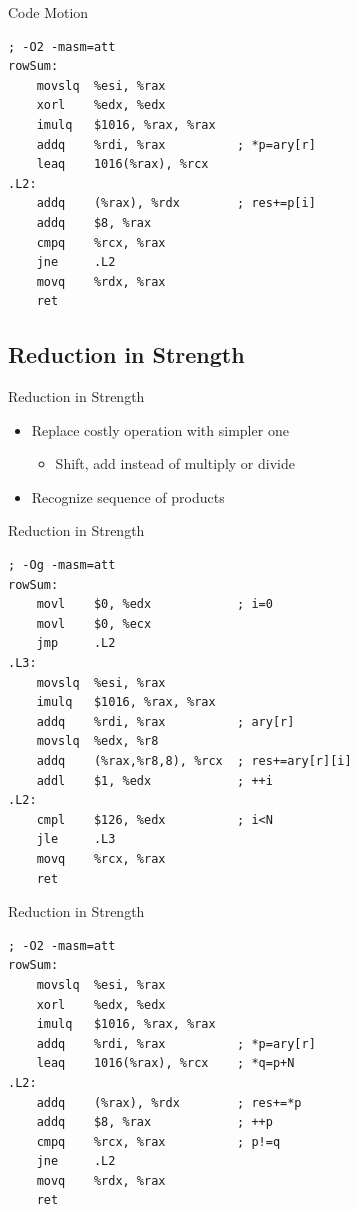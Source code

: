 ﻿\documentclass{ctexbeamer}
\begin{document}
\begin{frame}{Code Motion}
  \begin{lstlisting}[language=x86_64]
; -O2 -masm=att
rowSum:
    movslq  %esi, %rax
    xorl    %edx, %edx
    imulq   $1016, %rax, %rax
    addq    %rdi, %rax          ; *p=ary[r]
    leaq    1016(%rax), %rcx
.L2:
    addq    (%rax), %rdx        ; res+=p[i]
    addq    $8, %rax
    cmpq    %rcx, %rax
    jne     .L2
    movq    %rdx, %rax
    ret
  \end{lstlisting}
\end{frame}

\subsection{Reduction in Strength}

\begin{frame}{Reduction in Strength}
  \begin{itemize}
    \item Replace costly operation with simpler one
    \begin{itemize}
      \item Shift, add instead of multiply or divide
    \end{itemize}
    \item Recognize sequence of products
  \end{itemize}
\end{frame}

\begin{frame}[fragile,shrink=5]{Reduction in Strength}
  \begin{lstlisting}[language=x86_64]
; -Og -masm=att
rowSum:
    movl    $0, %edx            ; i=0
    movl    $0, %ecx
    jmp     .L2
.L3:
    movslq  %esi, %rax
    imulq   $1016, %rax, %rax
    addq    %rdi, %rax          ; ary[r]
    movslq  %edx, %r8
    addq    (%rax,%r8,8), %rcx  ; res+=ary[r][i]
    addl    $1, %edx            ; ++i
.L2:
    cmpl    $126, %edx          ; i<N
    jle     .L3
    movq    %rcx, %rax
    ret
  \end{lstlisting}
\end{frame}

\begin{frame}{Reduction in Strength}
  \begin{lstlisting}[language=x86_64]
; -O2 -masm=att
rowSum:
    movslq  %esi, %rax
    xorl    %edx, %edx
    imulq   $1016, %rax, %rax
    addq    %rdi, %rax          ; *p=ary[r]
    leaq    1016(%rax), %rcx    ; *q=p+N
.L2:
    addq    (%rax), %rdx        ; res+=*p
    addq    $8, %rax            ; ++p
    cmpq    %rcx, %rax          ; p!=q
    jne     .L2
    movq    %rdx, %rax
    ret
  \end{lstlisting}
\end{frame}
\end{document}
